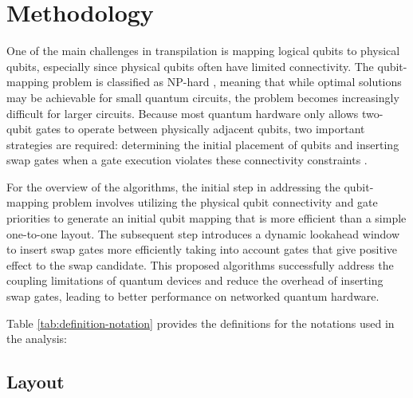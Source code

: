 \chapter{Methodology} \label{Chap3}
One of the main challenges in transpilation is mapping logical qubits to physical qubits, especially since physical qubits often have limited connectivity. The qubit-mapping problem is classified as NP-hard \cite{botea_complexity_2021}, meaning that while optimal solutions may be achievable for small quantum circuits, the problem becomes increasingly difficult for larger circuits. Because most quantum hardware only allows two-qubit gates to operate between physically adjacent qubits, two important strategies are required: determining the initial placement of qubits and inserting swap gates when a gate execution violates these connectivity constraints \cite{cowtan_qubit_2019}.

For the overview of the algorithms, the initial step in addressing the qubit-mapping problem involves utilizing the physical qubit connectivity and gate priorities to generate an initial qubit mapping that is more efficient than a simple one-to-one layout. The subsequent step introduces a dynamic lookahead window to insert swap gates more efficiently taking into account gates that give positive effect to the swap candidate. This proposed algorithms successfully address the coupling limitations of quantum devices and reduce the overhead of inserting swap gates, leading to better performance on networked quantum hardware.

Table \ref{tab:definition-notation} provides the definitions for the notations used in the analysis:


\section{Layout}
